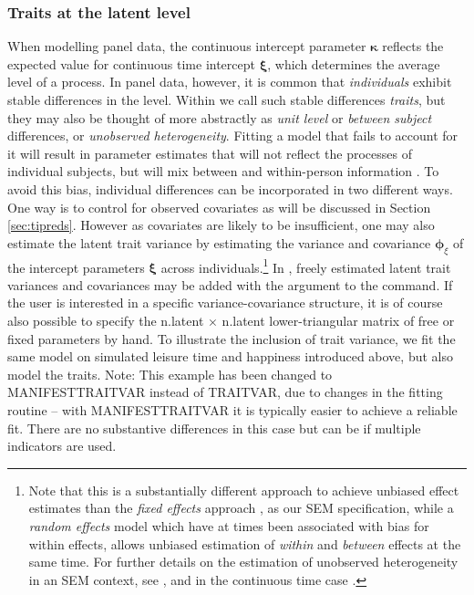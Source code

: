 \documentclass[nojss]{jss}\usepackage[]{graphicx}\usepackage[]{color}
\begin{document}
\subsubsection{Traits at the latent level} \label{sec:heterogeneity} \nopagebreak
When modelling panel data, the continuous intercept parameter $\boldsymbol{\kappa}$ reflects the expected value for continuous time intercept $\boldsymbol{\xi}$, which determines the average level of a process. In panel data, however, it is common that \textit{individuals} exhibit stable differences in the level. Within  we call such stable differences \textit{traits}, but they may also be thought of more abstractly as \textit{unit level} or \textit{between subject} differences, or \textit{unobserved heterogeneity}. Fitting a model that fails to account for it will result in parameter estimates that will not reflect the processes of individual subjects, but will mix between and within-person information \citep{balestra1966pooling, oud2000continuous, halaby2004panel}. 
To avoid this bias, individual differences can be incorporated in two different ways. One way is to control for observed covariates as will be discussed in Section \ref{sec:tipreds}. However as covariates are likely to be insufficient, one may also estimate the latent trait variance by estimating the variance and covariance $\boldsymbol{\phi}_{\xi}$ of the intercept parameters $\boldsymbol{\xi}$ across individuals.\footnote{Note that this is a substantially different approach to achieve unbiased effect estimates than the \textit{fixed effects} approach \citep[see for example][]{mundlak1978pooling}, as our SEM specification, while a \textit{random effects} model which have at times been associated with bias for within effects, allows unbiased estimation of \textit{within} and \textit{between} effects at the same time. For further details on the estimation of unobserved heterogeneity in an SEM context, see \citet{bollen2010general}, and in the continuous time case \citet{voelkle2015accounting}.} In , freely estimated latent trait variances and covariances may be added with the argument  to the  command. If the user is interested in a specific variance-covariance structure, it is of course also possible to specify the n.latent $\times$ n.latent lower-triangular matrix of free or fixed parameters by hand. To illustrate the inclusion of trait variance, we fit the same model on simulated leisure time and happiness introduced above, but also model the traits. Note: This example has been changed to MANIFESTTRAITVAR instead of TRAITVAR, due to changes in the fitting routine -- with MANIFESTTRAITVAR it is typically easier to achieve a reliable fit. There are no substantive differences in this case but can be if multiple indicators are used.
\end{document}
